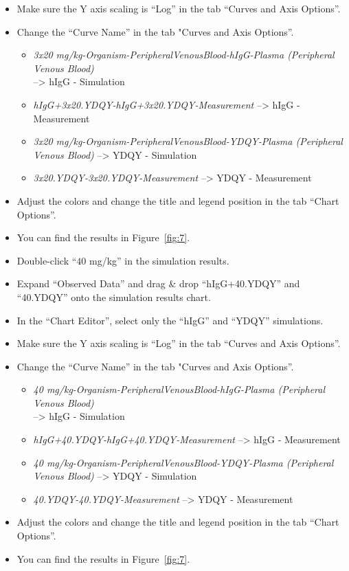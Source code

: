 \documentclass[fleqn,10pt]{physiome}
\begin{document}
\begin{itemize}
    \item Make sure the Y axis scaling is ``Log'' in the tab ``Curves and Axis Options''.
    \item Change the ``Curve Name'' in the tab "Curves and Axis Options''.
    \begin{itemize}
        \item \textit{3x20 mg/kg-Organism-PeripheralVenousBlood-hIgG-Plasma (Peripheral Venous Blood)} 
        \\--> hIgG -  Simulation
        \item \textit{hIgG+3x20.YDQY-hIgG+3x20.YDQY-Measurement} --> hIgG - Measurement
        \item \textit{3x20 mg/kg-Organism-PeripheralVenousBlood-YDQY-Plasma (Peripheral Venous Blood)} --> YDQY - Simulation
        \item \textit{3x20.YDQY-3x20.YDQY-Measurement} --> YDQY - Measurement
    \end{itemize}
    \item Adjust the colors and change the title and legend position in the tab ``Chart Options''.
    \item You can find the results in Figure~\ref{fig:7}.
    \item Double-click ``$40$ mg/kg'' in the simulation results.
    \item Expand ``Observed Data'' and drag \& drop ``hIgG+40.YDQY'' and ``40.YDQY'' onto the simulation results chart.
    \item In the ``Chart Editor'', select only the ``hIgG'' and ``YDQY'' simulations.
    \item Make sure the Y axis scaling is ``Log'' in the tab ``Curves and Axis Options''.
    \item Change the ``Curve Name'' in the tab "Curves and Axis Options''.
    \begin{itemize}
        \item \textit{40 mg/kg-Organism-PeripheralVenousBlood-hIgG-Plasma (Peripheral Venous Blood)} 
        \\--> hIgG -  Simulation
        \item \textit{hIgG+40.YDQY-hIgG+40.YDQY-Measurement} --> hIgG - Measurement
        \item \textit{40 mg/kg-Organism-PeripheralVenousBlood-YDQY-Plasma (Peripheral Venous Blood)} --> YDQY - Simulation
        \item \textit{40.YDQY-40.YDQY-Measurement} --> YDQY - Measurement
    \end{itemize}
    \item Adjust the colors and change the title and legend position in the tab ``Chart Options''.
    \item You can find the results in Figure~\ref{fig:7}.
\end{itemize}
\end{document}
